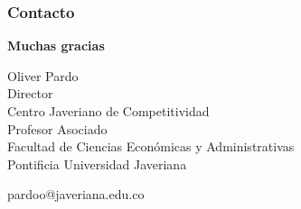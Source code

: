 \begin{frame}
    \frametitle{Contacto}
    
    \begin{center}
        \Large{\textbf{Muchas gracias}}
        
        \vspace{1cm}
        \normalsize
        Oliver Pardo\\
        Director\\
        Centro Javeriano de Competitividad \\
        Profesor Asociado\\
        Facultad de Ciencias Económicas y Administrativas\\
        Pontificia Universidad Javeriana
        
        \vspace{0.8cm}
        \small
        pardoo@javeriana.edu.co\\
    \end{center}
\end{frame}
